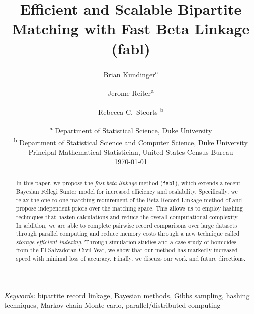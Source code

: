 \documentclass[12pt,letterpaper]{article}
\title{Efficient and Scalable Bipartite Matching with Fast Beta Linkage  (fabl)}
\author{Brian Kundinger\textsuperscript{a} \and
  Jerome Reiter\textsuperscript{a} \and 
  Rebecca C.~Steorts \textsuperscript{b}}
\date{
 \textsuperscript{a} Department of Statistical Science, Duke University \\
 \textsuperscript{b} Department of Statistical Science and Computer Science, Duke University\\Principal Mathematical Statistician, United States Census Bureau\\[2ex]
  \today}
\newcommand{\1}[1]{\mathbb{I}\!\left[#1\right]} %
\def\spacingset#1{\renewcommand{\baselinestretch}%
  {#1}\small\normalsize} \spacingset{1}
\begin{document}
\maketitle

\bigskip
\begin{abstract}



In this paper, we propose the \emph{fast beta linkage} method (\texttt{fabl}), which extends a recent Bayesian Fellegi Sunter model for increased efficiency and scalability. Specifically, we relax the one-to-one matching requirement of the Beta Record Linkage method of \citep{sadinle_bayesian_2017} and propose independent priors over the matching space. This allows us to employ hashing techniques that hasten calculations and reduce the overall computational complexity. In addition, we are able to complete pairwise record comparisons over large datasets through parallel computing and reduce memory costs through a new technique called \emph{storage efficient indexing}. Through simulation studies and a case study of homicides from the El Salvadoran Civil War, we show that our method has markedly increased speed with minimal loss of accuracy. Finally, we discuss our work and future directions. 

\end{abstract}


\noindent%
{\it Keywords:} bipartite record linkage, Bayesian methods, Gibbs sampling, hashing techniques, Markov chain Monte carlo, parallel/distributed computing

\newpage
\spacingset{1.5}
\end{document}

